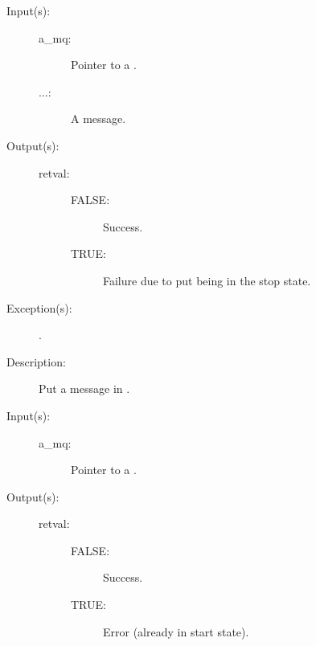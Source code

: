\begin{description}
\begin{description}
	\item[Input(s): ]
		\begin{description}\item[]
		\item[a\_mq: ]
			Pointer to a .
		\item[...: ]
			A message.
		\end{description}
	\item[Output(s): ]
		\begin{description}\item[]
		\item[retval: ]
			\begin{description}\item[]
			\item[FALSE: ] Success.
			\item[TRUE: ] Failure due to put being in the stop
				state.
			\end{description}
		\end{description}
	\item[Exception(s): ]
		\begin{description}\item[]
		\item[.]
		\end{description}
	\item[Description: ]
		Put a message in .
	\end{description}
\label{mq_get_start}
\item[{\cfunc[cw\_bool\_t]{mq\_get\_start}{cw\_mq\_t *a\_mq}}: ]
	\begin{description}\item[]
	\item[Input(s): ]
		\begin{description}\item[]
		\item[a\_mq: ]
			Pointer to a .
		\end{description}
	\item[Output(s): ]
		\begin{description}\item[]
		\item[retval: ]
			\begin{description}\item[]
			\item[FALSE: ] Success.
			\item[TRUE: ] Error (already in start state).
			\end{description}

\end{description}
\end{description}
\end{description}
